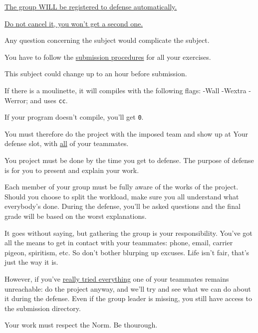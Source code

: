 
\item \underline{The group WILL be registered to defense automatically.}

\item \underline{Do not cancel it, you won't get a second one.}

\item Any question concerning the subject would complicate the subject.

\item You have to follow the \underline{submission procedures} for all your
    exercises.

\item This subject could change up to an hour before submission.

\item If there is a moulinette, it will compiles with the following flags: -Wall -Wextra -Werror; and uses \texttt{cc}.

\item If your program doesn’t compile, you’ll get \texttt{0}.

\item You must therefore do the project with the imposed team and show up
    at Your defense slot, with \underline{all} of your teammates.

\item You project must be done by the time you get to defense. The purpose
    of defense is for you to present and explain your work.

\item Each member of your group must be fully aware of the works of the project.
    Should you choose to split the workload, make sure you all understand what
    everybody's done. During the defense, you'll be asked questions and the final
    grade will be based on the worst explanations.

\item It goes without saying, but gathering the group is your responsibility.
    You've got all the means to get in contact with your teammates: phone, email, carrier pigeon,
    spiritism, etc. So don't bother blurping up excuses. Life isn't fair,
    that's just the way it is.

\item However, if you've \underline{really tried everything} one of your teammates
    remains unreachable: do the project anyway, and we'll try and see what we can do
    about it during the defense. Even if the group leader is missing, you still have
    access to the submission directory.

\item Your work must respect the Norm. Be thourough.